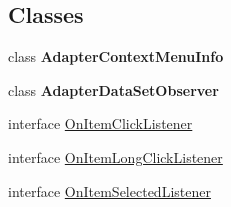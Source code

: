\subsection*{Classes}
\begin{DoxyCompactItemize}
\item 
class {\bfseries Adapter\+Context\+Menu\+Info}
\item 
class {\bfseries Adapter\+Data\+Set\+Observer}
\item 
interface \hyperlink{interfaceit_1_1sephiroth_1_1android_1_1library_1_1widget_1_1_adapter_view_1_1_on_item_click_listener}{On\+Item\+Click\+Listener}
\item 
interface \hyperlink{interfaceit_1_1sephiroth_1_1android_1_1library_1_1widget_1_1_adapter_view_1_1_on_item_long_click_listener}{On\+Item\+Long\+Click\+Listener}
\item 
interface \hyperlink{interfaceit_1_1sephiroth_1_1android_1_1library_1_1widget_1_1_adapter_view_1_1_on_item_selected_listener}{On\+Item\+Selected\+Listener}
\end{DoxyCompactItemize}
